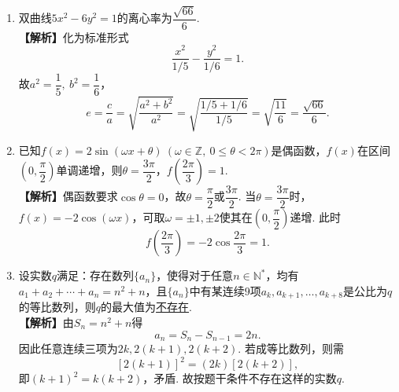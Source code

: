 \documentclass[12pt,a4paper]{article}
\begin{document}
	\vspace{0.3cm}
	
	
	\begin{enumerate}[leftmargin=*,label=\arabic*.,resume,itemsep=0.8ex]
		
		\item 双曲线$5x^2-6y^2=1$的离心率为\underline{\quad$\dfrac{\sqrt{66}}6$\quad}.\\
		\textbf{【解析】}化为标准形式
		\[
		\frac{x^2}{1/5}-\frac{y^2}{1/6}=1.
		\]
		故$a^2=\dfrac15,\ b^2=\dfrac16$，
		\[
		e=\frac ca=\sqrt{\frac{a^2+b^2}{a^2}}
		=\sqrt{\frac{1/5+1/6}{1/5}}=\sqrt{\frac{11}{6}}=\frac{\sqrt{66}}6.
		\]
		
		\item 已知$f(x)=2\sin(\omega x+\theta)\ (\omega\in\mathbb{Z},\ 0\le\theta<2\pi)$是偶函数，$f(x)$在区间$\left(0,\dfrac{\pi}{2}\right)$单调递增，则$\theta=$\underline{\quad$\dfrac{3\pi}{2}$\quad}，$f\left(\dfrac{2\pi}{3}\right)=$\underline{\quad$1$\quad}.\\
		\textbf{【解析】}偶函数要求$\cos\theta=0$，故$\theta=\dfrac\pi2$或$\dfrac{3\pi}2$. 当$\theta=\dfrac{3\pi}2$时，$f(x)=-2\cos(\omega x)$，可取$\omega=\pm1,\pm2$使其在$\left(0,\dfrac\pi2\right)$递增. 此时
		\[
		f\left(\frac{2\pi}3\right)=-2\cos\frac{2\pi}3=1.
		\]
		
		\item  设实数$q$满足：存在数列$\{a_n\}$，使得对于任意$n\in\mathbb{N}^*$，均有$a_1+a_2+\cdots+a_n=n^2+n$，且$\{a_n\}$中有某连续$9$项$a_k,a_{k+1},\dots,a_{k+8}$是公比为$q$的等比数列，则$q$的最大值为\underline{\quad 不存在\quad}.\\
		\textbf{【解析】}由$S_n=n^2+n$得
		\[
		a_n=S_n-S_{n-1}=2n.
		\]
		因此任意连续三项为$2k,2(k+1),2(k+2)$. 若成等比数列，则需
		\[
		[2(k+1)]^2=(2k)[2(k+2)],
		\]
		即$(k+1)^2=k(k+2)$，矛盾. 故按题干条件不存在这样的实数$q$.
		
	\end{enumerate}
	
	\vspace{0.3cm}
	
	
\end{document}
